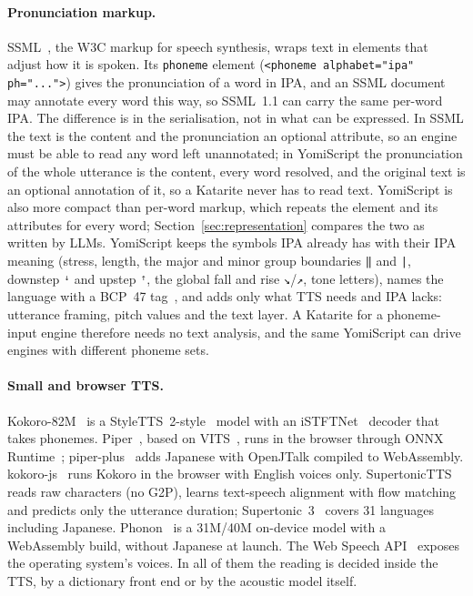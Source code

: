 \documentclass[11pt,a4paper]{article}
\newcommand{\ys}[1]{\mbox{\texttt{#1}}}
\begin{document}
\paragraph{Pronunciation markup.} SSML~\citep{ssml11}, the W3C markup for speech synthesis, wraps text in elements
that adjust how it is spoken. Its \texttt{phoneme} element (\texttt{<phoneme alphabet="ipa" ph="...">}) gives the
pronunciation of a word in IPA, and an SSML document may annotate every word this way, so SSML~1.1 can carry the same
per-word IPA. The difference is in the serialisation, not in what can be expressed. In SSML the text is the content and
the pronunciation an optional attribute, so an engine must be able to read any word left unannotated; in YomiScript
the pronunciation of the whole utterance is the content, every word resolved, and the original text is an optional
annotation of it, so a Katarite never has to read text. YomiScript is also more compact than per-word markup, which
repeats the element and its attributes for every word; Section~\ref{sec:representation} compares the two as written by
LLMs. YomiScript keeps the
symbols IPA already has with their IPA meaning (stress, length, the major and minor group boundaries \ys{‖}
and \ys{|}, downstep \ys{ꜜ} and upstep \ys{ꜛ}, the global fall and rise \ys{↘}/\ys{↗}, tone letters), names the
language with a BCP~47 tag~\citep{rfc5646}, and adds only what TTS needs and IPA lacks: utterance framing, pitch
values and the text layer. A Katarite for a phoneme-input engine therefore needs no text analysis, and the same
YomiScript can drive engines with different phoneme sets.

\paragraph{Small and browser TTS.} Kokoro-82M~\citep{kokoro82m} is a StyleTTS~2-style~\citep{li2023styletts2} model with
an iSTFTNet~\citep{kaneko2022istftnet} decoder that takes phonemes. Piper~\citep{piper}, based on VITS~\citep{kim2021vits},
runs in the browser through ONNX Runtime~\citep{onnxruntime}; piper-plus~\citep{piperplus} adds Japanese with OpenJTalk
compiled to WebAssembly. kokoro-js~\citep{kokorojs} runs Kokoro in the browser with English voices only.
SupertonicTTS~\citep{kim2025supertonic} reads raw characters (no G2P), learns text-speech alignment with flow
matching~\citep{lipman2023flow} and predicts only the utterance duration; Supertonic~3~\citep{supertonic3} covers 31
languages including Japanese. Phonon~\citep{phonon} is a 31M/40M on-device model with a WebAssembly build, without
Japanese at launch. The Web Speech API~\citep{webspeech} exposes the operating system's voices. In all of them the
reading is decided inside the TTS, by a dictionary front end or by the acoustic model itself.
\end{document}
